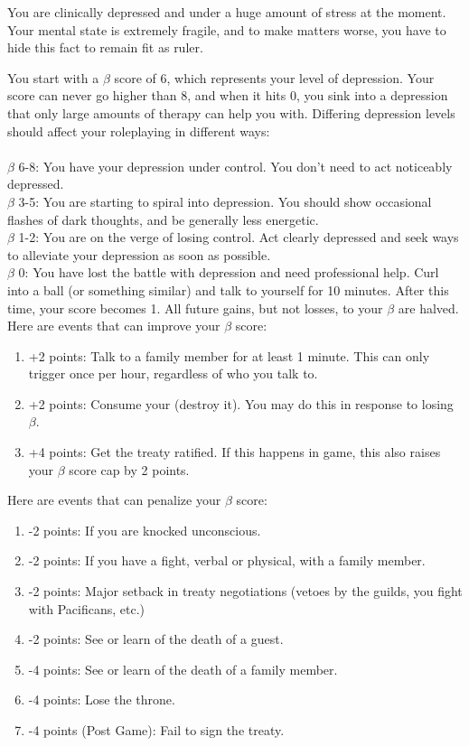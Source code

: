 \documentclass[green]{NeptuneBall}
\begin{document}
\name{\gDepression{}}

You are clinically depressed and under a huge amount of stress at the moment. Your mental state is extremely fragile, and to make matters worse, you have to hide this fact to remain fit as ruler.

You start with a $\beta$ score of 6, which represents your level of depression. Your score can never go higher than 8, and when it hits 0, you sink into a depression that only large amounts of therapy can help you with. Differing depression levels should affect your roleplaying in different ways: \\ \\
$\beta$ 6-8: You have your depression under control. You don't need to act noticeably depressed. \\
$\beta$ 3-5: You are starting to spiral into depression. You should show occasional flashes of dark thoughts, and be generally less energetic. \\
$\beta$ 1-2: You are on the verge of losing control. Act clearly depressed and seek ways to alleviate your depression as soon as possible. \\
$\beta$ 0: You have lost the battle with depression and need professional help. Curl into a ball (or something similar) and talk to yourself for 10 minutes. After this time, your score becomes 1. All future gains, but not losses, to your $\beta$ are halved. \\

Here are events that can improve your $\beta$ score: 

\begin{enumerate}
\item +2 points: Talk to a family member for at least 1 minute. This can only trigger once per hour, regardless of who you talk to.
\item +2 points: Consume your \iTablets{} (destroy it). You may do this in response to losing $\beta$.
\item +4 points: Get the treaty ratified. If this happens in game, this also raises your $\beta$ score cap by 2 points.
\end{enumerate}

Here are events that can penalize your $\beta$ score:

\begin{enumerate}
\item -2 points: If you are knocked unconscious.
\item -2 points: If you have a fight, verbal or physical, with a family member.
\item -2 points: Major setback in treaty negotiations (vetoes by the guilds, you fight with Pacificans, etc.)
\item -2 points: See or learn of the death of a guest.
\item -4 points: See or learn of the death of a family member.
\item -4 points: Lose the throne.
\item -4 points (Post Game): Fail to sign the treaty.
\end{enumerate}
\end{document}
